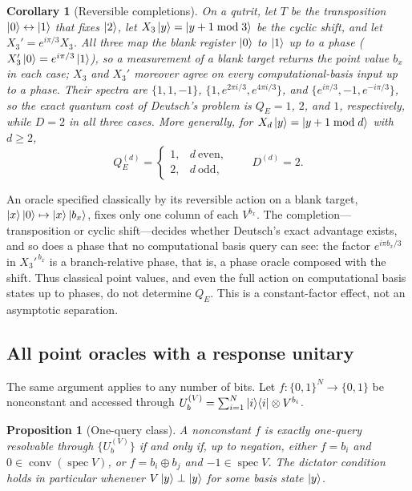 \documentclass[
  aps,
  pra,
  reprint,
  nofootinbib
]{revtex4-2}
\newtheorem{proposition}{Proposition}
\newtheorem{corollary}{Corollary}
\begin{document}
\begin{corollary}[Reversible completions]\label{cor:completions}
On a qutrit, let \(T\) be the transposition \(\ket0\leftrightarrow\ket1\) that
fixes \(\ket2\), let \(X_3\ket y=\ket{y+1\bmod 3}\) be the cyclic shift, and let
\(X_3'=e^{i\pi/3}X_3\). All three map the blank register \(\ket0\) to \(\ket1\)
up to a phase (\(X_3'\ket0=e^{i\pi/3}\ket1\)), so a measurement of a blank
target returns the point value \(b_x\) in each case; \(X_3\) and \(X_3'\)
moreover agree on every computational-basis input up to a phase. Their
spectra are \(\{1,1,-1\}\), \(\{1,e^{2\pi i/3},e^{4\pi i/3}\}\), and
\(\{e^{i\pi/3},-1,e^{-i\pi/3}\}\), so the exact quantum cost of Deutsch's
problem is \(Q_E=1\), \(2\), and \(1\), respectively, while \(D=2\) in all three
cases. More generally, for \(X_d\ket y=\ket{y+1\bmod d}\) with \(d\ge2\),
\begin{equation}
 Q_E^{(d)}=
 \begin{cases}1,&d\ \text{even},\\2,&d\ \text{odd},\end{cases}
 \qquad D^{(d)}=2.
 \label{eq:cyclic-response-cost}
\end{equation}
\end{corollary}

An oracle specified classically by its reversible action on a blank target,
\(\ket{x}\ket{0}\mapsto\ket{x}\ket{b_x}\), fixes only one column of each
\(V^{b_x}\). The completion---transposition or cyclic shift---decides whether
Deutsch's exact advantage exists, and so does a phase that no computational
basis query can see: the factor \(e^{i\pi b_x/3}\) in \(X_3'^{\,b_x}\) is a
branch-relative phase, that is, a phase oracle composed with the shift. Thus
classical point values, and even the full action on computational basis states
up to phases, do not determine \(Q_E\). This is a constant-factor effect, not an
asymptotic separation.

\subsection{All point oracles with a response unitary}

The same argument applies to any number of bits. Let \(f:\{0,1\}^N\to\{0,1\}\)
be nonconstant and accessed through
\(U_b^{(V)}=\sum_{i=1}^N\ket i\!\bra i\otimes V^{b_i}\).

\begin{proposition}[One-query class]\label{prop:oneclass}
A nonconstant \(f\) is exactly one-query resolvable through
\(\{U_b^{(V)}\}\) if and only if, up to negation, either \(f=b_i\) and
\(0\in\operatorname{conv}(\operatorname{spec}V)\), or \(f=b_i\oplus b_j\) and
\(-1\in\operatorname{spec}V\). The dictator condition holds in particular
whenever \(V\ket y\perp\ket y\) for some basis state \(\ket y\).
\end{proposition}
\end{document}
